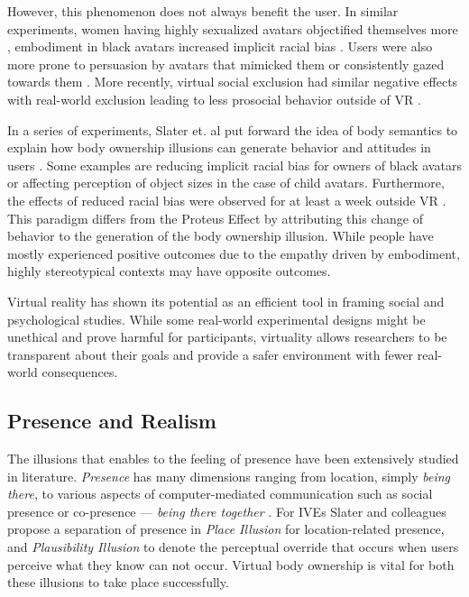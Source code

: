However, this phenomenon does not always benefit the user. In similar experiments, women having highly sexualized avatars objectified themselves more \cite{fox2013embodiment}, embodiment in black avatars increased implicit racial bias \cite{groom2009influence}. Users were also more prone to persuasion by avatars that mimicked them \cite{bailenson2006transformed} or consistently gazed towards them \cite{bailenson2005digital}. 
More recently, virtual social exclusion had similar negative effects with real-world exclusion leading to less prosocial behavior outside of VR \cite{kothgassner2017real}.

In a series of experiments, Slater et. al put forward the idea of body semantics to explain how body ownership illusions can generate behavior and attitudes in users \cite{slater2014transcending}. Some examples are reducing implicit racial bias for owners of black avatars or affecting perception of object sizes in the case of child avatars. Furthermore, the effects of reduced racial bias were observed for at least a week outside VR \cite{banakou2016virtual}. 
This paradigm differs from the Proteus Effect by attributing this change of behavior to the generation of the body ownership illusion. While people have mostly experienced positive outcomes due to the empathy driven by embodiment, highly stereotypical contexts may have opposite outcomes.


Virtual reality has shown its potential as an efficient tool in framing social and psychological studies. 
While some real-world experimental designs might be unethical and prove harmful for participants, virtuality allows researchers to be transparent about their goals and provide a safer environment with fewer real-world consequences.

\subsection{Presence and Realism}
The illusions that enables to the feeling of presence have been extensively studied in literature. 
\textit{Presence} has many dimensions ranging from location, simply \textit{being there}, to various aspects of computer-mediated communication such as social presence or co-presence --- \textit{being there together} \cite{zhao2003toward}.
For IVEs Slater and colleagues propose a separation of presence in \textit{Place Illusion} for location-related presence, and \textit{Plausibility Illusion} to denote the perceptual override that occurs when users perceive what they know can not occur.
Virtual body ownership is vital for both these illusions to take place successfully. 

